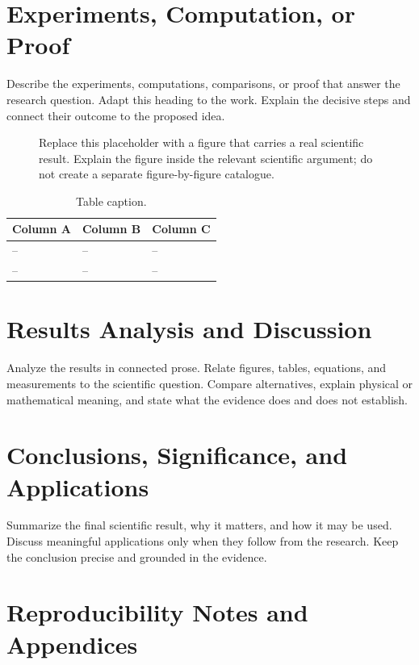 \documentclass[11pt,a4paper]{article}
\begin{document}
\section{Experiments, Computation, or Proof}

Describe the experiments, computations, comparisons, or proof that answer the
research question. Adapt this heading to the work. Explain the decisive steps
and connect their outcome to the proposed idea.

\begin{figure}[htbp]
\centering
\fbox{\rule{0pt}{1.8in}\rule{0.85\textwidth}{0pt}}
\caption{Replace this placeholder with a figure that carries a real scientific
result. Explain the figure inside the relevant scientific argument; do not
create a separate figure-by-figure catalogue.}
\label{fig:report-example}
\end{figure}

\begin{table}[htbp]
\caption{Table caption.}
\label{tab:report-example}
\begin{tabularx}{\textwidth}{YYY}
\toprule
Column A & Column B & Column C \\
\midrule
-- & -- & -- \\
-- & -- & -- \\
\bottomrule
\end{tabularx}
\end{table}

\section{Results Analysis and Discussion}

Analyze the results in connected prose. Relate figures, tables, equations, and
measurements to the scientific question. Compare alternatives, explain physical
or mathematical meaning, and state what the evidence does and does not establish.

\section{Conclusions, Significance, and Applications}

Summarize the final scientific result, why it matters, and how it may be used.
Discuss meaningful applications only when they follow from the research. Keep
the conclusion precise and grounded in the evidence.

\appendix
\section{Reproducibility Notes and Appendices}
\end{document}
